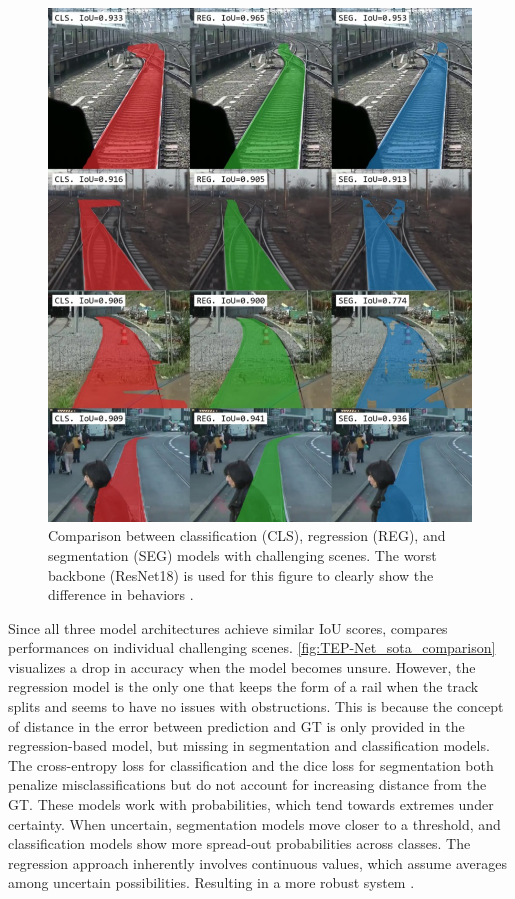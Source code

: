 \begin{figure}[H]
    \centering
    \includegraphics[width=0.7\linewidth]{PICs/Baselinepaper/comparison_sota_tep-net.jpg}
    \caption{Comparison between classification (CLS), regression (REG), and segmentation (SEG) models with challenging scenes.
    The worst backbone (ResNet18) is used for this figure to clearly show the difference in behaviors \cite{tepNet2024}.}
    \label{fig:TEP-Net_sota_comparison}
\end{figure}

Since all three model architectures achieve similar \ac{IoU} scores, \cite{tepNet2024} compares performances on individual challenging scenes.
\autoref{fig:TEP-Net_sota_comparison} visualizes a drop in accuracy when the model becomes unsure.
However, the regression model is the only one that keeps the form of a rail when the track splits and seems to have no issues with obstructions.
This is because the concept of distance in the error between prediction and \ac{GT} is only provided in the regression-based model, but missing in segmentation and classification models.
The cross-entropy loss for classification and the dice loss for segmentation both penalize misclassifications but do not account for increasing distance from the \ac{GT}.
These models work with probabilities, which tend towards extremes under certainty.
When uncertain, segmentation models move closer to a threshold, and classification models show more spread-out probabilities across classes.
The regression approach inherently involves continuous values, which assume averages among uncertain possibilities.
Resulting in a more robust system \cite{tepNet2024}.

